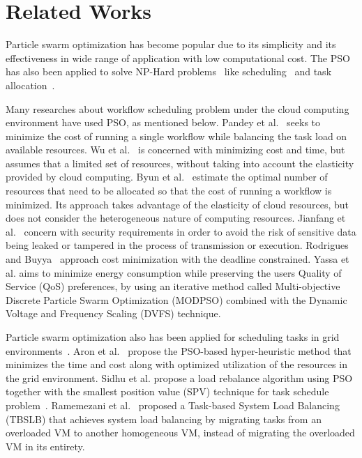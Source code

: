 \section{Related Works}
\label{sec:Trabalhos}
Particle swarm optimization has become popular due to its simplicity and its effectiveness in wide range of application with low computational cost. The PSO has also been applied to solve NP-Hard problems~\cite{sousa2004} like scheduling~\cite{veeramachaneni2004,Dasgupta2014} and task allocation~\cite{yin2006, zavala2008}.

Many researches about workflow scheduling problem under the cloud computing environment have used PSO, as mentioned below. Pandey et al.~\cite{pandey2010} seeks to minimize the cost of running a single workflow while balancing the task load on available resources. Wu et al.~\cite{wu2010} is concerned with minimizing cost and time, but assumes that a limited set of resources, without taking into account the elasticity provided by cloud computing. Byun et al.~\cite{byun2011} estimate the optimal number of resources that need to be allocated so that the cost of running a workflow is minimized. Its approach takes advantage of the elasticity of cloud resources, but does not consider the heterogeneous nature of computing resources. Jianfang et al.~\cite{Marcon2013} concern with security requirements in order to avoid the risk  of sensitive  data being  leaked or tampered in the process of transmission or execution. Rodrigues and Buyya~\cite{rodriguez2014} approach cost minimization with the deadline constrained. Yassa et al. aims to minimize energy consumption while preserving the users Quality of Service (QoS) preferences, by using an iterative method called Multi-objective Discrete Particle Swarm Optimization (MODPSO) combined with the Dynamic Voltage and Frequency Scaling (DVFS) technique. 

Particle swarm optimization also has been applied for scheduling tasks in grid environments~\cite{zhang2006, liu2010}. Aron et al.~\cite{aron2015} propose the PSO-based hyper-heuristic method that minimizes the time and cost along with optimized utilization of the resources in the grid environment. Sidhu et al. propose a load rebalance algorithm using PSO together with the smallest position value (SPV) technique for task schedule problem~\cite{sidhu2013}. Ramemezani et al.~\cite{ramezani2014} proposed a Task-based System Load Balancing (TBSLB) that achieves system load balancing by migrating tasks from an overloaded VM to another homogeneous VM, instead of migrating the overloaded VM in its entirety.
